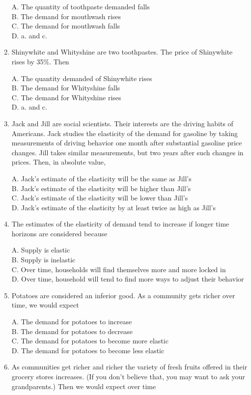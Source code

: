 \documentclass[
]{book}
\begin{document}
\begin{enumerate}
  A. The quantity of toothpaste demanded falls\\
  B. The demand for mouthwash rises\\
  C. The demand for mouthwash falls\\
  D. a. and c.~
\item
  Shinywhite and Whityshine are two toothpastes. The price of Shinywhite rises by 35\%. Then

  A. The quantity demanded of Shinywhite rises\\
  B. The demand for Whityshine falls\\
  C. The demand for Whityshine rises\\
  D. a. and c.~
\item
  Jack and Jill are social scientists. Their interests are the driving habits of Americans. Jack studies the elasticity of the demand for gasoline by taking measurements of driving behavior one month after substantial gasoline price changes. Jill takes similar measurements, but two years after such changes in prices. Then, in absolute value,

  A. Jack's estimate of the elasticity will be the same as Jill's\\
  B. Jack's estimate of the elasticity will be higher than Jill's\\
  C. Jack's estimate of the elasticity will be lower than Jill's\\
  D. Jack's estimate of the elasticity by at least twice as high as Jill's
\item
  The estimates of the elasticity of demand tend to increase if longer time horizons are considered because

  A. Supply is elastic\\
  B. Supply is inelastic\\
  C. Over time, households will find themselves more and more locked in\\
  D. Over time, household will tend to find more ways to adjust their behavior
\item
  Potatoes are considered an inferior good. As a community gets richer over time, we would expect

  A. The demand for potatoes to increase\\
  B. The demand for potatoes to decrease\\
  C. The demand for potatoes to become more elastic\\
  D. The demand for potatoes to become less elastic
\item
  As communities get richer and richer the variety of fresh fruits offered in their grocery stores increases. (If you don't believe that, you may want to ask your grandparents.) Then we would expect over time


\end{enumerate}
\end{document}
